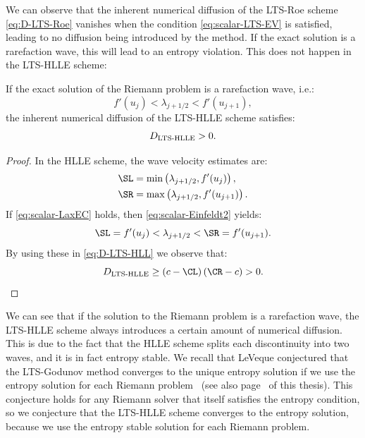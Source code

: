 We can observe that the inherent numerical diffusion of the LTS-Roe scheme \eqref{eq:D-LTS-Roe} vanishes when the condition \eqref{eq:scalar-LTS-EV} is satisfied, leading to no diffusion being introduced by the method. If the exact solution is a rarefaction wave, this will lead to an entropy violation. This does not happen in the LTS-HLLE scheme:
\begin{proposition} \label{prop:LTS-HLL-D}
If the exact solution of the Riemann problem is a rarefaction wave, i.e.:
\begin{equation} \label{eq:scalar-LaxEC}
f'(u_j) < \lambda_{j+1/2} < f'(u_{j+1}),
\end{equation}
the inherent numerical diffusion of the LTS-HLLE scheme satisfies:
\begin{equation}
D_\textup{LTS-HLLE} > 0.
\end{equation}
\end{proposition}
\begin{proof}
In the HLLE scheme, the wave velocity estimates are:
\begin{subequations} \label{eq:scalar-Einfeldt2}
\begin{align}
\SL & = \min \left( \lambda_{j+1/2}, f'(u_j) \right), \\
\SR & = \max \left( \lambda_{j+1/2}, f'(u_{j+1}) \right).
\end{align}
\end{subequations}
If \eqref{eq:scalar-LaxEC} holds, then \eqref{eq:scalar-Einfeldt2} yields:
\begin{equation}
\SL = f'(u_j) < \lambda_{j+1/2} < \SR = f'(u_{j+1}).
\end{equation}
By using these in \eqref{eq:D-LTS-HLL} we observe that:
\begin{equation}
D_\textup{LTS-HLLE} \geq \left( c - \CL \right) \left( \CR - c \right) > 0. 
\end{equation}
\end{proof}
We can see that if the solution to the Riemann problem is a rarefaction wave, the LTS-HLLE scheme always introduces a certain amount of numerical diffusion. This is due to the fact that the HLLE scheme splits each discontinuity into two waves, and it is in fact entropy stable. We recall that LeVeque conjectured that the LTS-Godunov method converges to the unique entropy solution if we use the entropy solution for each Riemann problem~\cite{lev84} (see also page~\pageref{sec:LTS-entropy-stability} of this thesis). This conjecture holds for any Riemann solver that itself satisfies the entropy condition, so we conjecture that the LTS-HLLE scheme converges to the entropy solution, because we use the entropy stable solution for each Riemann problem. 

